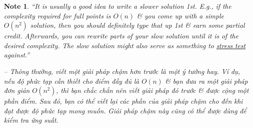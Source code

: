 \documentclass{article}
\newtheorem{note}{Note}
\begin{document}
\begin{note}
    ``It is usually a good idea to write a slower solution 1st. E.g., if the complexity required for full points is $O(n)$ \& you come up with a simple $O(n^2)$ solution, then you should definitely type that up 1st \& earn some partial credit. Afterwards, you can rewrite parts of your slow solution until it is of the desired complexity. The slow solution might also serve as something to \href{https://usaco.guide/general/basic-debugging#stress-testing}{stress test} against.''

    -- Thông thường, viết một giải pháp chậm hơn trước là một ý tưởng hay. Ví dụ, nếu độ phức tạp cần thiết cho điểm đầy đủ là $O(n)$ \& bạn đưa ra một giải pháp đơn giản $O(n^2)$, thì bạn chắc chắn nên viết giải pháp đó trước \& được cộng một phần điểm. Sau đó, bạn có thể viết lại các phần của giải pháp chậm cho đến khi đạt được độ phức tạp mong muốn. Giải pháp chậm này cũng có thể được dùng để kiểm tra ứng suất.
\end{note}
\end{document}
